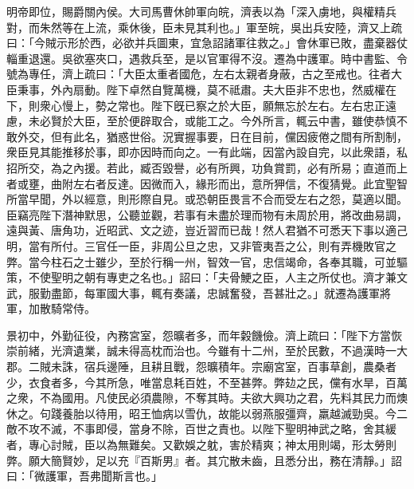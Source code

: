 \begin{pinyinscope}
 
 
 
 明帝即位，賜爵關內侯。大司馬曹休帥軍向皖，濟表以為「深入虜地，與權精兵對，而朱然等在上流，乘休後，臣未見其利也。」軍至皖，吳出兵安陸，濟又上疏曰：「今賊示形於西，必欲并兵圖東，宜急詔諸軍往救之。」會休軍已敗，盡棄器仗輜重退還。吳欲塞夾口，遇救兵至，是以官軍得不沒。遷為中護軍。時中書監、令號為專任，濟上疏曰：「大臣太重者國危，左右太親者身蔽，古之至戒也。往者大臣秉事，外內扇動。陛下卓然自覽萬機，莫不祗肅。夫大臣非不忠也，然威權在下，則衆心慢上，勢之常也。陛下旣已察之於大臣，願無忘於左右。左右忠正遠慮，未必賢於大臣，至於便辟取合，或能工之。今外所言，輒云中書，雖使恭慎不敢外交，但有此名，猶惑世俗。況實握事要，日在目前，儻因疲倦之間有所割制，衆臣見其能推移於事，即亦因時而向之。一有此端，因當內設自完，以此衆語，私招所交，為之內援。若此，臧否毀譽，必有所興，功負賞罰，必有所易；直道而上者或壅，曲附左右者反達。因微而入，緣形而出，意所狎信，不復猜覺。此宜聖智所當早聞，外以經意，則形際自見。或恐朝臣畏言不合而受左右之怨，莫適以聞。臣竊亮陛下潛神默思，公聽並觀，若事有未盡於理而物有未周於用，將改曲易調，遠與黃、唐角功，近昭武、文之迹，豈近習而已哉！然人君猶不可悉天下事以適己明，當有所付。三官任一臣，非周公旦之忠，又非管夷吾之公，則有弄機敗官之弊。當今柱石之士雖少，至於行稱一州，智效一官，忠信竭命，各奉其職，可並驅策，不使聖明之朝有專吏之名也。」詔曰：「夫骨鯁之臣，人主之所仗也。濟才兼文武，服勤盡節，每軍國大事，輒有奏議，忠誠奮發，吾甚壯之。」就遷為護軍將軍，加散騎常侍。
 
 
 
 
景初中，外勤征役，內務宮室，怨曠者多，而年糓饑儉。濟上疏曰：「陛下方當恢崇前緒，光濟遺業，誠未得高枕而治也。今雖有十二州，至於民數，不過漢時一大郡。二賊未誅，宿兵邊陲，且耕且戰，怨曠積年。宗廟宮室，百事草創，農桑者少，衣食者多，今其所急，唯當息耗百姓，不至甚弊。弊攰之民，儻有水旱，百萬之衆，不為國用。凡使民必須農隙，不奪其時。夫欲大興功之君，先料其民力而燠休之。句踐養胎以待用，昭王恤病以雪仇，故能以弱燕服彊齊，羸越滅勁吳。今二敵不攻不滅，不事即侵，當身不除，百世之責也。以陛下聖明神武之略，舍其緩者，專心討賊，臣以為無難矣。又歡娛之躭，害於精爽；神太用則竭，形太勞則弊。願大簡賢妙，足以充『百斯男』者。其宂散未齒，且悉分出，務在清靜。」詔曰：「微護軍，吾弗聞斯言也。」
 

\end{pinyinscope}
